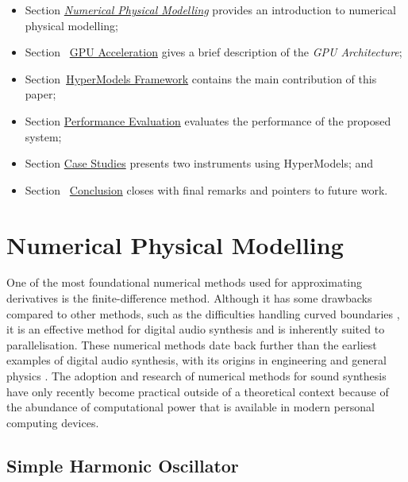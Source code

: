 \documentclass[sigconf]{nimeart}
\begin{document}
\begin{itemize}
\item
  Section \href{https://nime.pubpub.org/pub/ludxkhhz/draft/44?from=7432&to=7460}{\emph{Numerical Physical Modelling}} provides an introduction to numerical physical modelling;
\item
  Section~ \href{https://nime.pubpub.org/pub/ludxkhhz/draft/320?from=12228&to=12244}{GPU Acceleration} gives a brief description of the \emph{GPU Architecture};
\item
  Section~\href{https://nime.pubpub.org/pub/ludxkhhz/draft/350?from=15068&to=15089}{HyperModels Framework} contains the main contribution of this paper;
\item
  Section \href{https://nime.pubpub.org/pub/ludxkhhz/draft/374?from=23868&to=23890}{Performance Evaluation} evaluates the performance of the proposed system;
\item
  Section \href{https://nime.pubpub.org/pub/ludxkhhz/draft/401?from=29914&to=29926}{Case Studies} presents two instruments using HyperModels; and
\item
  Section~ \href{https://nime.pubpub.org/pub/ludxkhhz/draft/418?from=35451&to=35461}{Conclusion} closes with final remarks and pointers to future work.
\end{itemize}

\section{Numerical Physical Modelling}\label{numerical-physical-modelling}

One of the most foundational numerical methods used for approximating derivatives is the finite-difference method. Although it has some drawbacks compared to other methods, such as the difficulties handling curved boundaries \cite{Reddy2010finite}, it is an effective method for digital audio synthesis and is inherently suited to parallelisation. These numerical methods date back further than the earliest examples of digital audio synthesis, with its origins in engineering and general physics \cite{Courant1967On}. The adoption and research of numerical methods for sound synthesis have only recently become practical outside of a theoretical context because of the abundance of computational power that is available in modern personal computing devices.

\subsection{Simple Harmonic Oscillator}\label{simple-harmonic-oscillator}
\end{document}
